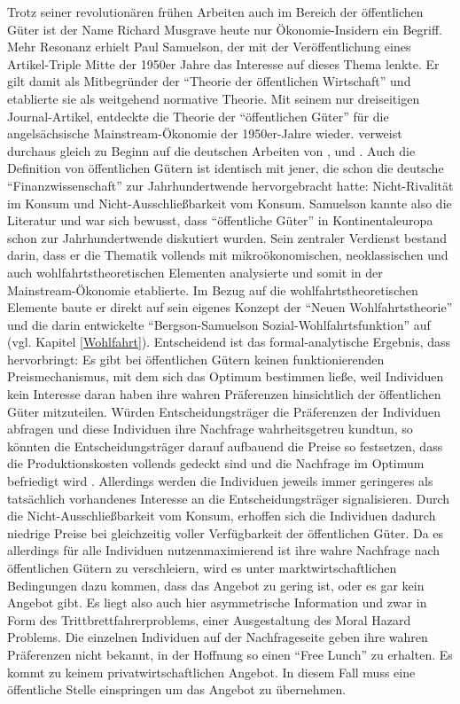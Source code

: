 Trotz seiner revolutionären frühen Arbeiten auch im Bereich der öffentlichen Güter ist der Name Richard Musgrave heute nur Ökonomie-Insidern ein Begriff. Mehr Resonanz erhielt Paul Samuelson, der mit der Veröffentlichung eines Artikel-Triple \parencite{Samuelson1954, Samuelson1955, Samuelson1958} Mitte der 1950er Jahre das Interesse auf dieses Thema lenkte. Er gilt damit als Mitbegründer der "`Theorie der öffentlichen Wirtschaft"' und etablierte sie als weitgehend normative Theorie. Mit seinem nur dreiseitigen Journal-Artikel, entdeckte \textcite{Samuelson1954} die Theorie der "`öffentlichen Güter"' für die angelsächsische Mainstream-Ökonomie der 1950er-Jahre wieder.  \textcite[S. 387]{Samuelson1954} verweist durchaus gleich zu Beginn auf die deutschen Arbeiten von \textcite{Sax1887}, \textcite{Lindhal1928} und \textcite{Wicksell1896}. Auch die Definition von öffentlichen Gütern ist identisch mit jener, die schon die deutsche "`Finanzwissenschaft"' zur Jahrhundertwende hervorgebracht hatte: Nicht-Rivalität im Konsum und Nicht-Ausschließbarkeit vom Konsum. Samuelson kannte also die Literatur und war sich bewusst, dass "`öffentliche Güter"' in Kontinentaleuropa schon zur Jahrhundertwende diskutiert wurden. Sein zentraler Verdienst bestand darin, dass er die Thematik vollends mit mikroökonomischen, neoklassischen und auch wohlfahrtstheoretischen Elementen analysierte und somit in der Mainstream-Ökonomie etablierte. Im Bezug auf die wohlfahrtstheoretischen Elemente baute er direkt auf sein eigenes Konzept der "`Neuen Wohlfahrtstheorie"' und die darin entwickelte "`Bergson-Samuelson Sozial-Wohlfahrtsfunktion"' auf (vgl. Kapitel \ref{Wohlfahrt}). Entscheidend ist das formal-analytische Ergebnis, dass \textcite{Samuelson1954} hervorbringt: Es gibt bei öffentlichen Gütern keinen funktionierenden Preismechanismus, mit dem sich das Optimum bestimmen ließe, weil Individuen kein Interesse daran haben ihre wahren Präferenzen hinsichtlich der öffentlichen Güter mitzuteilen. Würden Entscheidungsträger die Präferenzen der Individuen abfragen und diese Individuen ihre Nachfrage wahrheitsgetreu kundtun, so könnten die Entscheidungsträger darauf aufbauend die Preise so festsetzen, dass die Produktionskosten vollends gedeckt sind und die Nachfrage im Optimum befriedigt wird \parencite[S. 389]{Samuelson1954}. Allerdings werden die Individuen jeweils immer geringeres als tatsächlich vorhandenes Interesse an die Entscheidungsträger signalisieren. Durch die Nicht-Ausschließbarkeit vom Konsum, erhoffen sich die Individuen dadurch niedrige Preise bei gleichzeitig voller Verfügbarkeit der öffentlichen Güter. Da es allerdings für alle Individuen nutzenmaximierend ist ihre wahre Nachfrage nach öffentlichen Gütern zu verschleiern, wird es unter marktwirtschaftlichen Bedingungen dazu kommen, dass das Angebot zu gering ist, oder es gar kein Angebot gibt. Es liegt also auch hier asymmetrische Information und zwar in Form des Trittbrettfahrerproblems, einer Ausgestaltung des Moral Hazard Problems. Die einzelnen Individuen auf der Nachfrageseite geben ihre wahren Präferenzen nicht bekannt, in der Hoffnung so einen "`Free Lunch"' zu erhalten. Es kommt zu keinem privatwirtschaftlichen Angebot. In diesem Fall muss eine öffentliche Stelle einspringen um das Angebot zu übernehmen. 

